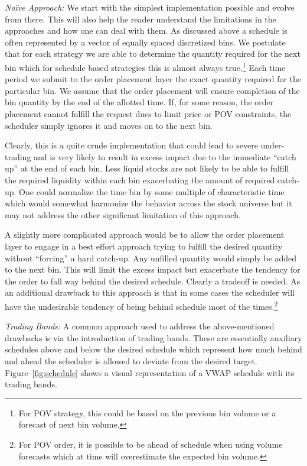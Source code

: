 \noindent\emph{Na\"ive Approach:} We start with the simplest implementation possible and evolve from there. This will also help the reader understand the limitations in the approaches and how one can deal with them. As discussed above a schedule is often represented by a vector of equally spaced discretized bins. We postulate that for each strategy we are able to determine the quantity required for the next bin which for schedule based strategies this is almost always true.\footnote{For POV strategy, this could be based on the previous bin volume or a forecast of next bin volume.} Each time period we submit to the order placement layer the exact quantity required for the particular bin. We assume that the order placement will ensure completion of the bin quantity by the end of the allotted time. If, for some reason, the order placement cannot fulfill the request dues to limit price or POV constraints, the scheduler simply ignores it and moves on to the next bin. 


Clearly, this is a quite crude implementation that could lead to severe under-trading and is very likely to result in excess impact due to the immediate ``catch up'' at the end of each bin. Less liquid stocks are not likely to be able to fulfill the required liquidity within each bin exacerbating the amount of required catch-up. One could normalize the time bin by some multiple of characteristic time which would somewhat harmonize the behavior across the stock universe but it may not address the other significant limitation of this approach.


A slightly more complicated approach would be to allow the order placement layer to engage in a best effort approach trying to fulfill the desired quantity without ``forcing'' a hard catch-up. Any unfilled quantity would simply be added to the next bin. This will limit the excess impact but exacerbate the tendency for the order to fall way behind the desired schedule. Clearly a tradeoff is needed. As an additional drawback to this approach is that in some cases the scheduler will have the undesirable tendency of being behind schedule most of the times.\footnote{For POV order, it is possible to be ahead of schedule when using volume forecasts which at time will overestimate the expected bin volume.} \twomedskip


\noindent\emph{Trading Bands:} A common approach used to address the above-mentioned drawbacks is via the introduction of trading bands. These are essentially auxiliary schedules above and below the desired schedule which represent how much behind and ahead the scheduler is allowed to deviate from the desired target. Figure~\ref{fig:schedule} shows a visual representation of a VWAP schedule with its trading bands. 

